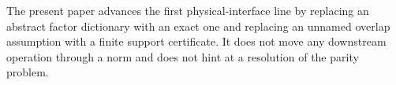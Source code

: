 The present paper advances the first physical-interface line by replacing
an abstract factor dictionary with an exact one and replacing an unnamed
overlap assumption with a finite support certificate.  It does not move
any downstream operation through a norm and does not hint at a resolution
of the parity problem.
